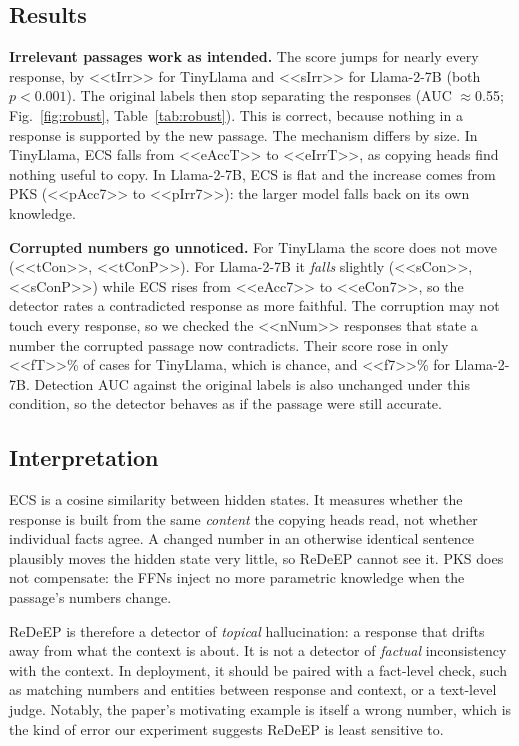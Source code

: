 \documentclass[conference]{IEEEtran}
\begin{document}
\subsection{Results}
\textbf{Irrelevant passages work as intended.} The score jumps for nearly every response, by <<tIrr>> for TinyLlama and <<sIrr>> for Llama-2-7B (both $p<0.001$). The original labels then stop separating the responses (AUC $\approx$0.55; Fig.~\ref{fig:robust}, Table~\ref{tab:robust}). This is correct, because nothing in a response is supported by the new passage. The mechanism differs by size. In TinyLlama, ECS falls from <<eAccT>> to <<eIrrT>>, as copying heads find nothing useful to copy. In Llama-2-7B, ECS is flat and the increase comes from PKS (<<pAcc7>> to <<pIrr7>>): the larger model falls back on its own knowledge.

\textbf{Corrupted numbers go unnoticed.} For TinyLlama the score does not move (<<tCon>>, <<tConP>>). For Llama-2-7B it \emph{falls} slightly (<<sCon>>, <<sConP>>) while ECS rises from <<eAcc7>> to <<eCon7>>, so the detector rates a contradicted response as more faithful. The corruption may not touch every response, so we checked the <<nNum>> responses that state a number the corrupted passage now contradicts. Their score rose in only <<fT>>\% of cases for TinyLlama, which is chance, and <<f7>>\% for Llama-2-7B. Detection AUC against the original labels is also unchanged under this condition, so the detector behaves as if the passage were still accurate.

\subsection{Interpretation}
ECS is a cosine similarity between hidden states. It measures whether the response is built from the same \emph{content} the copying heads read, not whether individual facts agree. A changed number in an otherwise identical sentence plausibly moves the hidden state very little, so ReDeEP cannot see it. PKS does not compensate: the FFNs inject no more parametric knowledge when the passage's numbers change.

ReDeEP is therefore a detector of \emph{topical} hallucination: a response that drifts away from what the context is about. It is not a detector of \emph{factual} inconsistency with the context. In deployment, it should be paired with a fact-level check, such as matching numbers and entities between response and context, or a text-level judge. Notably, the paper's motivating example is itself a wrong number, which is the kind of error our experiment suggests ReDeEP is least sensitive to.
\end{document}
